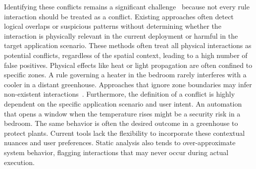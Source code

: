 Identifying these conflicts remains a significant challenge~\cite{huang2023survey,huang2021conflict,li2020diac,trimananda2020understanding,yagita2015application,chaki2020fine,yu2022tapinspector,pradeep2021automating} because not every rule interaction should be treated as a conflict. Existing approaches often detect logical overlaps or suspicious patterns without determining whether the interaction is physically relevant in the current deployment or harmful in the target application scenario.
These methods often treat all physical interactions as potential conflicts, regardless of the spatial context, leading to a high number of false positives. Physical effects like heat or light propagation are often confined to specific zones. A rule governing a heater in the bedroom rarely interferes with a cooler in a distant greenhouse. Approaches that ignore zone boundaries may infer non-existent interactions~\cite{huang2023survey,huang2021conflict,li2020diac,trimananda2020understanding,yagita2015application,chaki2020fine,yu2022tapinspector,pradeep2021automating}. Furthermore, the definition of a conflict is highly dependent on the specific application scenario and user intent. An automation that opens a window when the temperature rises might be a security risk in a bedroom. The same behavior is often the desired outcome in a greenhouse to protect plants. Current tools lack the flexibility to incorporate these contextual nuances and user preferences. Static analysis also tends to over-approximate system behavior, flagging interactions that may never occur during actual execution.


